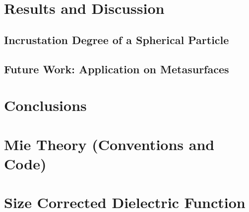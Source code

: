 \documentclass[11pt]{Latex/Classes/PhDthesisPSnPDF}
\begin{document}
%

\chapter{Results and Discussion}
	
	\section{Incrustation Degree of a Spherical Particle}
%	
    \section{Future Work: Application on Metasurfaces}

\chapter{Conclusions}


\appendix

\chapter{Mie Theory (Conventions and Code)}
  \label{app:MieCode}
  

\chapter{Size Corrected Dielectric Function}
  \label{app:SizeCorrection}
  


%
%

\setlength{}
\printbibliography

\newpage
\printindex
\end{document}
